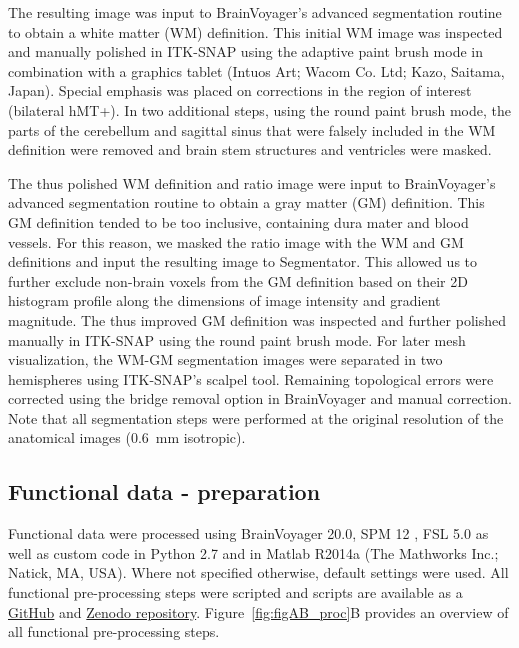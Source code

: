 The resulting image was input to BrainVoyager's advanced segmentation routine to obtain a white matter (WM) definition. This initial WM image was inspected and manually polished in ITK-SNAP using the adaptive paint brush mode in combination with a graphics tablet (Intuos Art; Wacom Co. Ltd; Kazo, Saitama, Japan). Special emphasis was placed on corrections in the region of interest (bilateral hMT+). In two additional steps, using the round paint brush mode, the parts of the cerebellum and sagittal sinus that were falsely included in the WM definition were removed and brain stem structures and ventricles were masked.

The thus polished WM definition and ratio image were input to BrainVoyager's advanced segmentation routine to obtain a gray matter (GM) definition. This GM definition tended to be too inclusive, containing dura mater and blood vessels. For this reason, we masked the ratio image with the WM and GM definitions and input the resulting image to Segmentator. This allowed us to further exclude non-brain voxels from the GM definition based on their 2D histogram profile along the dimensions of image intensity and gradient magnitude. The thus improved GM definition was inspected and further polished manually in ITK-SNAP using the round paint brush mode. For later mesh visualization, the WM-GM segmentation images were separated in two hemispheres using ITK-SNAP's scalpel tool. Remaining topological errors were corrected using the bridge removal option in BrainVoyager \parencite{Kriegeskorte2001} and manual correction. Note that all segmentation steps were performed at the original resolution of the anatomical images (0.6~mm isotropic).

\subsection{Functional data - preparation}
Functional data were processed using BrainVoyager 20.0, SPM 12 \parencite{Friston2006}, FSL 5.0 \parencite{Jenkinson2012} as well as custom code in Python 2.7 \parencite{numpy2011, scipy2001, matplotlib2007} and in Matlab R2014a (The Mathworks Inc.; Natick, MA, USA). Where not specified otherwise, default settings were used. All functional pre-processing steps were scripted and scripts are available as a \href{https://github.com/MSchnei/motion_quartet_scripts}{GitHub} and \href{https://zenodo.org/record/1489246}{Zenodo repository}. Figure~\ref{fig:figAB_proc}B provides an overview of all functional pre-processing steps. 

